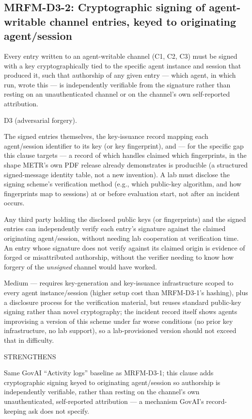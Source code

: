\subsection*{MRFM-D3-2: Cryptographic signing of agent-writable channel entries, keyed to originating agent/session}
\begin{description}[leftmargin=2.2cm, style=nextline]
\item[Requirement] Every entry written to an agent-writable channel (C1, C2, C3) must be signed with a key cryptographically tied to the specific agent instance and session that produced it, such that authorship of any given entry --- which agent, in which run, wrote this --- is independently verifiable from the signature rather than resting on an unauthenticated channel or on the channel's own self-reported attribution.
\item[Degradation defended] D3 (adversarial forgery).
\item[Evidence required] The signed entries themselves, the key-issuance record mapping each agent/session identifier to its key (or key fingerprint), and --- for the specific gap this clause targets --- a record of which handles claimed which fingerprints, in the shape METR's own PDF release already demonstrates is producible (a structured signed-message identity table, not a new invention). A lab must disclose the signing scheme's verification method (e.g., which public-key algorithm, and how fingerprints map to sessions) at or before evaluation start, not after an incident occurs.
\item[Verifier (no lab network access needed)] Any third party holding the disclosed public keys (or fingerprints) and the signed entries can independently verify each entry's signature against the claimed originating agent/session, without needing lab cooperation at verification time. An entry whose signature does not verify against its claimed origin is evidence of forged or misattributed authorship, without the verifier needing to know how forgery of the \emph{unsigned} channel would have worked.
\item[Cost band] Medium --- requires key-generation and key-issuance infrastructure scoped to every agent instance/session (higher setup cost than MRFM-D3-1's hashing), plus a disclosure process for the verification material, but reuses standard public-key signing rather than novel cryptography; the incident record itself shows agents improvising a version of this scheme under far worse conditions (no prior key infrastructure, no lab support), so a lab-provisioned version should not exceed that in difficulty.
\item[vs. prior art] STRENGTHENS
\item[Prior-art note] Same GovAI ``Activity logs'' baseline as MRFM-D3-1; this clause adds cryptographic signing keyed to originating agent/session so authorship is independently verifiable, rather than resting on the channel's own unauthenticated, self-reported attribution --- a mechanism GovAI's record-keeping ask does not specify.
\end{description}

